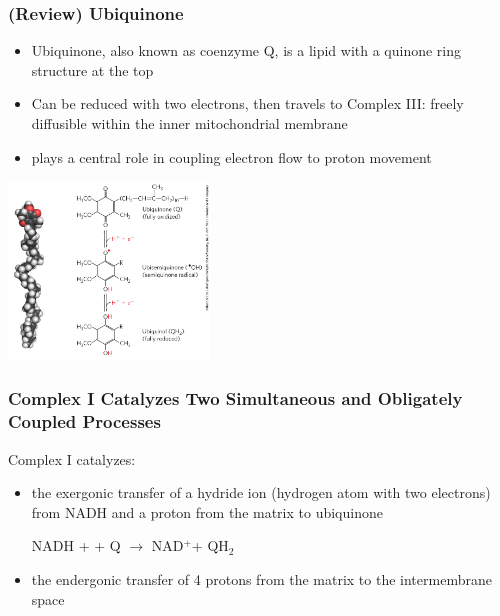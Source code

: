 \documentclass[10pt]{article}
\newcommand{\proton}{\text{H$^+$}}
\newcommand{\pc}{$^+$}
\begin{document}
\subsubsection*{(Review) Ubiquinone}
\begin{itemize}
	\item Ubiquinone, also known as coenzyme Q, is a lipid with a quinone ring structure at the top
	\item Can be reduced with two electrons, then travels to Complex III: freely diffusible within the inner mitochondrial membrane
	\item plays a central role in coupling electron flow to proton movement
\end{itemize}
\begin{center} 
	\includegraphics*[width=0.4\textwidth]{L1_7.png} 
\end{center}

\subsubsection*{Complex I Catalyzes Two Simultaneous and Obligately Coupled Processes}
Complex I catalyzes:
\begin{itemize}
	\item the exergonic transfer of a hydride ion (hydrogen atom with two electrons) from NADH and a proton from the matrix to ubiquinone
	\begin{center}
        NADH + \proton + Q $\rightarrow$ NAD\pc + QH$_2$
    \end{center}
    \item the endergonic transfer of 4 protons from the matrix to the intermembrane space
\end{itemize}
\end{document}
